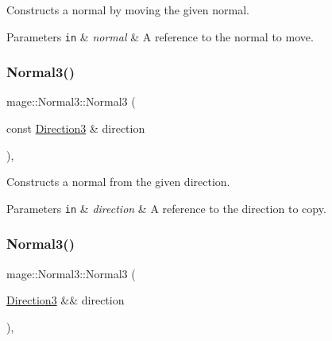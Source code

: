 Constructs a normal by moving the given normal.


\begin{DoxyParams}[1]{Parameters}
\mbox{\tt in}  & {\em normal} & A reference to the normal to move. \\
\hline
\end{DoxyParams}
\hypertarget{structmage_1_1_normal3_a477777d95f0ad41e6087668c965dd9b2}{}\label{structmage_1_1_normal3_a477777d95f0ad41e6087668c965dd9b2} 
\subsubsection{\texorpdfstring{Normal3()}{Normal3()}\hspace{0.1cm}{\footnotesize\ttfamily [5/8]}}
{\footnotesize\ttfamily mage\+::\+Normal3\+::\+Normal3 (\begin{DoxyParamCaption}\item[{const \hyperlink{structmage_1_1_direction3}{Direction3} \&}]{direction }\end{DoxyParamCaption})\hspace{0.3cm}{\ttfamily [explicit]}, {\ttfamily [noexcept]}}

Constructs a normal from the given direction.


\begin{DoxyParams}[1]{Parameters}
\mbox{\tt in}  & {\em direction} & A reference to the direction to copy. \\
\hline
\end{DoxyParams}
\hypertarget{structmage_1_1_normal3_a55d265ba8454dd5d4573ad9d09844cee}{}\label{structmage_1_1_normal3_a55d265ba8454dd5d4573ad9d09844cee} 
\subsubsection{\texorpdfstring{Normal3()}{Normal3()}\hspace{0.1cm}{\footnotesize\ttfamily [6/8]}}
{\footnotesize\ttfamily mage\+::\+Normal3\+::\+Normal3 (\begin{DoxyParamCaption}\item[{\hyperlink{structmage_1_1_direction3}{Direction3} \&\&}]{direction }\end{DoxyParamCaption})\hspace{0.3cm}{\ttfamily [explicit]}, {\ttfamily [noexcept]}}

